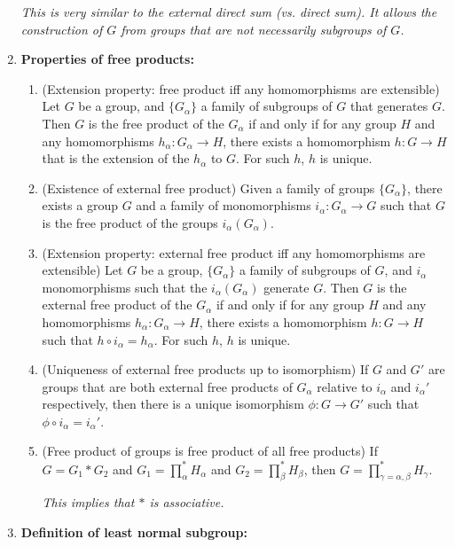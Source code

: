 \documentclass[letterpaper, 12pt]{book}
\begin{document}
\begin{enumerate}[resume]
{        \textit{This is very similar to the external direct sum (vs. direct sum). It allows the construction of $G$ from groups that are not necessarily subgroups of $G$.}}
    \item \textbf{Properties of free products:}
        \begin{enumerate}
        \item (Extension property: free product iff any homomorphisms are extensible) Let $G$ be a group, and $\{G_\alpha\}$ a family of subgroups of $G$ that generates $G$. Then $G$ is the free product of the $G_\alpha$ if and only if for any group $H$ and any homomorphisms $h_\alpha : G_\alpha \to H$, there exists a homomorphism $h: G\to H$ that is the extension of the $h_\alpha$ to $G$. For such $h$, $h$ is unique.
        \item (Existence of external free product) Given a family of groups $\{G_\alpha\}$, there exists a group $G$ and a family of monomorphisms $i_\alpha : G_\alpha \to G$ such that $G$ is the free product of the groups $i_\alpha(G_\alpha)$.
        \item (Extension property: external free product iff any homomorphisms are extensible) Let $G$ be a group, $\{G_\alpha\}$ a family of subgroups of $G$, and $i_\alpha$ monomorphisms such that the $i_\alpha(G_\alpha)$ generate $G$. Then $G$ is the external free product of the $G_\alpha$ if and only if for any group $H$ and any homomorphisms $h_\alpha : G_\alpha \to H$, there exists a homomorphism $h: G\to H$ such that $h\circ i_\alpha = h_\alpha$. For such $h$, $h$ is unique.
        \item (Uniqueness of external free products up to isomorphism) If $G$ and $G'$ are groups that are both external free products of $G_\alpha$ relative to $i_\alpha$ and $i_\alpha'$ respectively, then there is a unique isomorphism $\phi : G\to G'$ such that $\phi\circ i_\alpha = i_\alpha'$.
        \item (Free product of groups is free product of all free products) If $G = G_1 * G_2$ and $G_1 = \prod_\alpha^* H_\alpha$ and $G_2 = \prod_\beta^* H_\beta$, then $G = \prod_{\gamma = \alpha, \beta}^* H_\gamma$.

        \textit{This implies that $*$ is associative.}
        \end{enumerate}
    \item \textbf{Definition of least normal subgroup:}


\end{enumerate}
\end{document}
